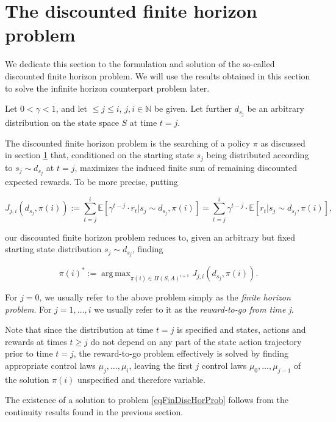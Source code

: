 \documentclass[11pt]{article} %
\DeclareMathOperator*{\argmax}{arg\,max}
\begin{document}
\section{The discounted finite horizon problem}

We dedicate this section to the formulation and solution of the so-called discounted finite horizon problem. We will use the results obtained in this section to solve the infinite horizon counterpart problem later.

Let $0 < \gamma < 1$, and let $\le j \le i$, $j,i \in \mathbb{N}$ be given. Let further $d_{s_j}$ be an arbitrary distribution on the state space $S$ at time $t = j$.

The discounted finite horizon problem is the searching of a policy $\pi$ as discussed in section \ref{} that, conditioned on the starting state $s_j$ being distributed according to $s_j \sim d_{s_j}$ at $t=j$, maximizes the induced finite sum of remaining discounted expected rewards. To be more precise, putting

\begin{equation}\label{eqFinDiscHorReward}
		J_{j,i}(d_{s_j},\pi(i)) := \sum\limits_{t=j}^i \mathbb{E}[ \gamma^{t-j} \cdot r_t | s_j \sim d_{s_j}, \pi(i)] = \sum\limits_{t=j}^i \gamma^{t-j} \cdot \mathbb{E}[ r_t | s_j \sim d_{s_j}, \pi(i)],
\end{equation}

our discounted finite horizon problem reduces to, given an arbitrary but fixed starting state distribution $s_j \sim d_{s_j}$, finding

\begin{equation}\label{eqFinDiscHorProb}
	\pi(i)^* := \argmax_{\pi(i) \in \Pi(S,A)^{i+1}} J_{j,i}(d_{s_j},\pi(i)).
\end{equation}

For $j=0$, we usually refer to the above problem simply as the \textit{finite horizon problem}. For $j = 1,\dots,i$ we usually refer to it as the \textit{reward-to-go from time j}. 

Note that since the distribution at time $t = j$ is specified and states, actions and  rewards at times $t \ge j$ do not depend on any part of the state action trajectory prior to time $t = j$, the reward-to-go problem effectively is solved by finding appropriate control laws $\mu_j,\dots,\mu_i$, leaving the first $j$ control laws $\mu_0,\dots,\mu_{j-1}$ of the solution $\pi(i)$ unspecified and therefore variable.

The existence of a solution to problem \ref{eqFinDiscHorProb} follows from the continuity results found in the previous section.
\end{document}
